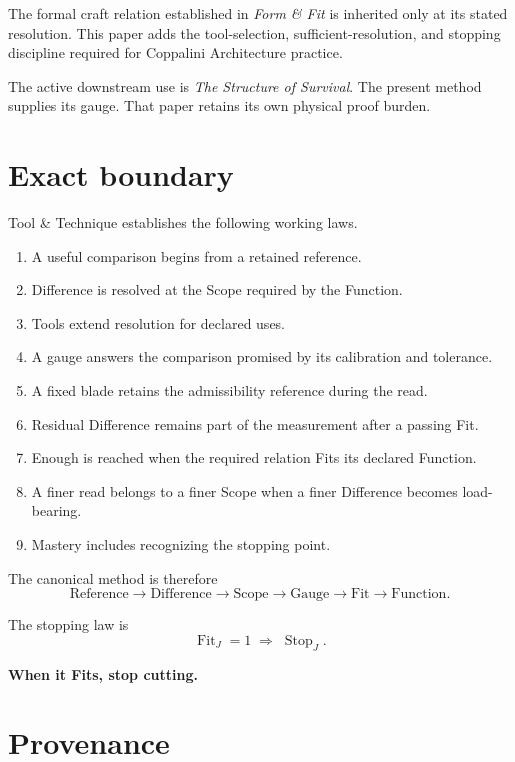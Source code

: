 \documentclass[10pt]{article}
\newcommand{\fit}{\operatorname{Fit}}
\newcommand{\stopop}{\operatorname{Stop}}
\begin{document}
The formal craft relation established in \emph{Form \& Fit} is inherited only at its stated resolution. This paper adds the tool-selection, sufficient-resolution, and stopping discipline required for Coppalini Architecture practice.

The active downstream use is \emph{The Structure of Survival}. The present method supplies its gauge. That paper retains its own physical proof burden.

\section{Exact boundary}

Tool \& Technique establishes the following working laws.

\begin{enumerate}[label=\roman*.]
\item A useful comparison begins from a retained reference.
\item Difference is resolved at the Scope required by the Function.
\item Tools extend resolution for declared uses.
\item A gauge answers the comparison promised by its calibration and tolerance.
\item A fixed blade retains the admissibility reference during the read.
\item Residual Difference remains part of the measurement after a passing Fit.
\item Enough is reached when the required relation Fits its declared Function.
\item A finer read belongs to a finer Scope when a finer Difference becomes load-bearing.
\item Mastery includes recognizing the stopping point.
\end{enumerate}

The canonical method is therefore
\[
\boxed{\mathrm{Reference}\to\mathrm{Difference}\to\mathrm{Scope}\to\mathrm{Gauge}\to\mathrm{Fit}\to\mathrm{Function}.}
\]

The stopping law is
\[
\boxed{\fit_J=1\;\Longrightarrow\;\stopop_J.}
\]

\begin{center}
\large\bfseries When it Fits, stop cutting.
\end{center}

\section*{Provenance}
\end{document}

